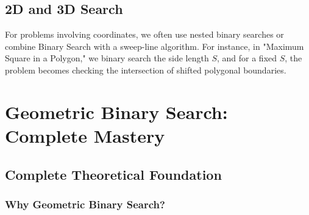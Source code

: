 \documentclass[11pt,a4paper,oneside]{book}
\begin{document}
\subsection{2D and 3D Search}
For problems involving coordinates, we often use nested binary searches or combine Binary Search with a sweep-line algorithm. For instance, in "Maximum Square in a Polygon," we binary search the side length $S$, and for a fixed $S$, the problem becomes checking the intersection of shifted polygonal boundaries.

\section{Geometric Binary Search: Complete Mastery}

\subsection{Complete Theoretical Foundation}

\subsubsection{Why Geometric Binary Search?}
\end{document}
